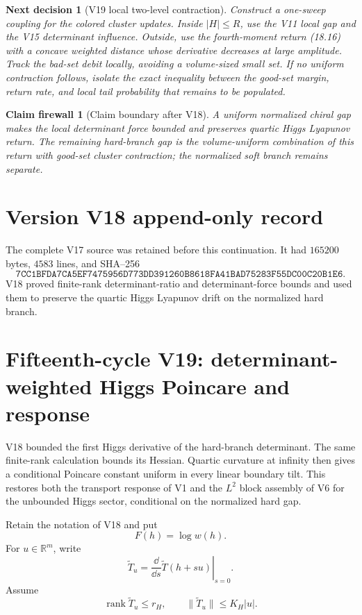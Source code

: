\documentclass[11pt]{article}
\newtheorem{firewall}[theorem]{Claim firewall}
\newtheorem{decision}[theorem]{Next decision}
\theoremstyle{remark}
\begin{document}
\begin{decision}[V19 local two-level contraction]
\label{dec:v15v18-next}
Construct a one-sweep coupling for the colored cluster updates.
Inside \(|H|\le R\), use the V11 local gap and the V15 determinant
influence.  Outside, use the fourth-moment return (18.16) with a
concave weighted distance whose derivative decreases at large
amplitude.  Track the bad-set debit locally, avoiding a
volume-sized small set.  If no uniform contraction follows, isolate
the exact inequality between the good-set margin, return rate, and
local tail probability that remains to be populated.
\end{decision}

\begin{firewall}[Claim boundary after V18]
\label{fire:v15v18}
A uniform normalized chiral gap makes the local determinant force
bounded and preserves quartic Higgs Lyapunov return.  The remaining
hard-branch gap is the volume-uniform combination of this return
with good-set cluster contraction; the normalized soft branch
remains separate.
\end{firewall}

\section*{Version V18 append-only record}
The complete V17 source was retained before this continuation.  It
had \(165200\) bytes, \(4583\) lines, and SHA--256
\[
 \texttt{7CC1BFDA7CA5EF7475956D773DD391260B8618FA41BAD75283F55DC00C20B1E6}.
\]
V18 proved finite-rank determinant-ratio and determinant-force
bounds and used them to preserve the quartic Higgs Lyapunov drift
on the normalized hard branch.
\section{Fifteenth-cycle V19: determinant-weighted Higgs Poincare and response}
\label{sec:v15v19}

V18 bounded the first Higgs derivative of the hard-branch
determinant.  The same finite-rank calculation bounds its Hessian.
Quartic curvature at infinity then gives a conditional Poincare
constant uniform in every linear boundary tilt.  This restores both
the transport response of V1 and the \(L^2\) block assembly of V6
for the unbounded Higgs sector, conditional on the normalized hard
gap.

Retain the notation of V18 and put
\[
 F(h)=\log w(h).
\]
For \(u\in\mathbb R^m\), write
\[
 \widetilde T_u
 =
 \left.\frac{\dd}{\dd s}\widetilde T(h+su)\right|_{s=0}.
\]
Assume
\[
 \operatorname{rank}\widetilde T_u\le r_H,\qquad
 \|\widetilde T_u\|\le K_H|u|.                              \tag{19.1}
\]
\end{document}
